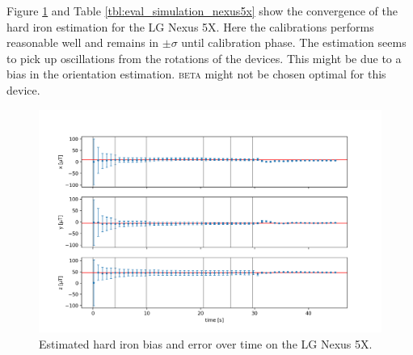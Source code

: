 Figure \ref{fig:eval_simulation_nexus5x} and Table \ref{tbl:eval_simulation_nexus5x} show the convergence of the hard iron estimation for the LG Nexus 5X. Here the calibrations performs reasonable well and remains in $\pm \sigma$ until calibration phase. The estimation seems to pick up oscillations from the rotations of the devices. This might be due to a bias in the orientation estimation. \textsc{beta} might not be chosen optimal for this device.

\begin{figure}[H]
    \centering
    \includegraphics[width=1.0\textwidth]{figures/convergence_nexus5x.png}
    \caption{Estimated hard iron bias and error over time on the LG Nexus 5X.}
    \label{fig:eval_simulation_nexus5x}
\end{figure}

